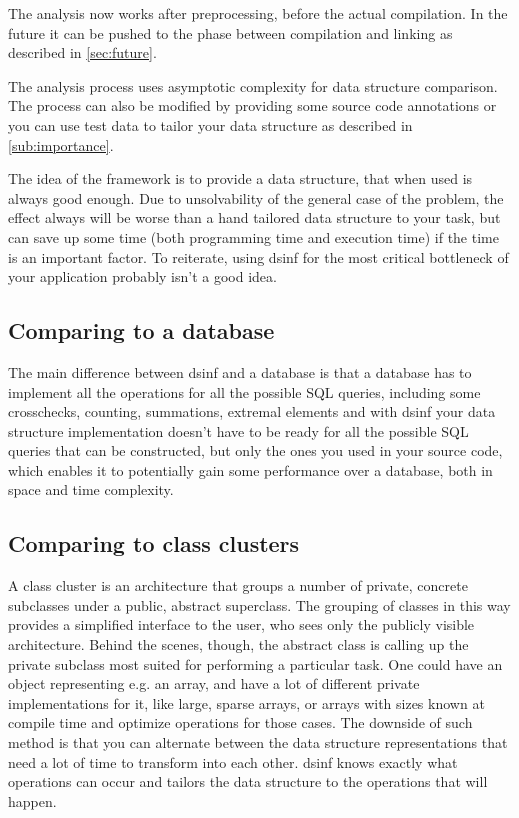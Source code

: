 \documentclass[a4paper,11pt]{article}
\begin{document}
		The analysis now works after preprocessing, before the actual compilation. In the future it can be
		pushed to the phase between compilation and linking as described in \autoref{sec:future}.

		The analysis process uses asymptotic complexity for data structure comparison. The process can also be
		modified by providing some source code annotations or you can use test data to tailor your data
		structure as described in \autoref{sub:importance}.

		The idea of the framework is to provide a data structure, that when used is always good enough. Due to
		unsolvability of the general case of the problem, the effect always will be worse than a hand tailored
		data structure to your task, but can save up some time (both programming time and execution time) if the
        time is an important factor. To reiterate, using dsinf for the most critical bottleneck of your
		application probably isn't a good idea.

	\subsection{Comparing to a database} \label{sub:database}
		The main difference between dsinf and a database is that a database has to implement all the operations
		for all the possible SQL queries, including some crosschecks, counting, summations, extremal elements
		and with dsinf your data structure implementation doesn't have to be ready for all the possible SQL
		queries that can be constructed, but only the ones you used in your source code, which enables it to
		potentially gain some performance over a database, both in space and time complexity.

	\subsection{Comparing to class clusters} \label{sub:classcluster}
		A class cluster is an architecture that groups a number of private, concrete subclasses under a public,
		abstract superclass. The grouping of classes in this way provides a simplified interface to the user,
		who sees only the publicly visible architecture. Behind the scenes, though, the abstract class is
		calling up the private subclass most suited for performing a particular task\cite{AppleCC}. One could
		have an object representing e.g. an array, and have a lot of different private implementations for it, like
		large, sparse arrays, or arrays with sizes known at compile time and optimize operations for those
		cases. The downside of such method is that you can alternate between the data structure representations
		that need a lot of time to transform into each other. dsinf knows exactly what operations can occur and
		tailors the data structure to the operations that will happen.
\end{document}
